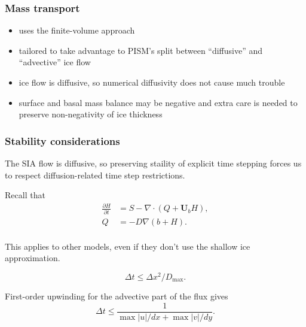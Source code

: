 \documentclass[hide notes,intlimits]{beamer}
\begin{document}
\begin{frame}
  \frametitle{Mass transport}
  \begin{itemize}
  \item uses the finite-volume approach
  \item tailored to take advantage to PISM's split between
    ``diffusive'' and ``advective'' ice flow
  \item ice flow is diffusive, so numerical diffusivity does not cause
    much trouble
  \item surface and basal mass balance may be negative and extra care
    is needed to preserve non-negativity of ice thickness
  \end{itemize}
\end{frame}


\begin{frame}
  \frametitle{Stability considerations}

  The SIA flow is diffusive, so preserving staility of explicit time
  stepping forces us to respect diffusion-related time step
  restrictions.

  Recall that
  \begin{align}
    \label{eq:2}
    \frac{\partial H}{\partial t} &= S - \nabla \cdot (Q + \mathbf{U}_b H),\\
    Q &= -D \nabla (b + H).\\
  \end{align}

  This applies to other models, even if they don't use the shallow ice
  approximation.

  \begin{equation}
    \label{eq:3}
    \Delta t \le \Delta x^{2} / D_{\text{max}}.
  \end{equation}

  First-order upwinding for the advective part of the flux gives
  \begin{equation}
    \label{eq:6}
    \Delta t \le \frac{1}{\max|u| / dx + \max|v| / dy}.
  \end{equation}
\end{frame}
\end{document}
